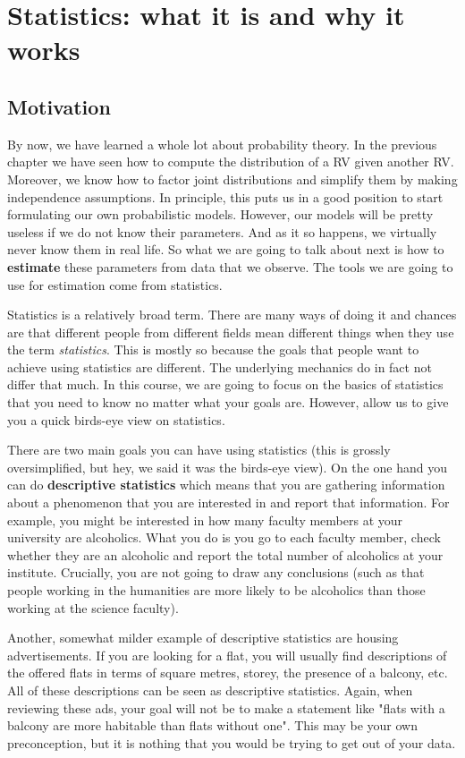 \chapter{Statistics: what it is and why it works}

\section{Motivation}

By now, we have learned a whole lot about probability theory. In the previous chapter we have seen
how to compute the distribution of a RV given another RV. Moreover, we know how to factor joint distributions and simplify them by making
independence assumptions. In principle, this puts us in a good position to start formulating our
own probabilistic models. However, our models will be pretty useless if we do not know their parameters. And as
it so happens, we virtually never know them in real life. So what we are going to talk about next is how to \textbf{estimate}
these parameters from data that we observe. The tools we are going to use for estimation come from statistics.

Statistics is a relatively broad term. There are many ways of doing it and chances are that different people from different
fields mean different things when they use the term \textit{statistics}. This is mostly so because the goals that people 
want to achieve using statistics are different. The underlying mechanics do in fact not differ that much. In this course,
we are going to focus on the basics of statistics that you need to know no matter what your goals are. However, allow us
to give you a quick birds-eye view on statistics. 

There are two main goals you can have using statistics (this is grossly oversimplified, but hey, we said it was the birds-eye
view). On the one hand you can do \textbf{descriptive statistics} which means that you are gathering information about a phenomenon
that you are interested in and report that information. For example, you might be interested in how many faculty members
at your university are alcoholics. What you do is you go to each faculty member, check whether they are an alcoholic
and report the total number of alcoholics at your institute. Crucially, you are not going to draw any conclusions (such as that people working in the humanities are more
likely to be alcoholics than those working at the science faculty).

Another, somewhat milder example of descriptive statistics are housing advertisements. If you are looking for a flat, you will usually
find descriptions of the offered flats in terms of square metres, storey, the presence of a balcony, etc. All of these descriptions
can be seen as descriptive statistics. Again, when reviewing these ads, your goal will not be to make a statement like "flats
with a balcony are more habitable than flats without one". This may be your own preconception, but it is nothing that
you would be trying to get out of your data.

